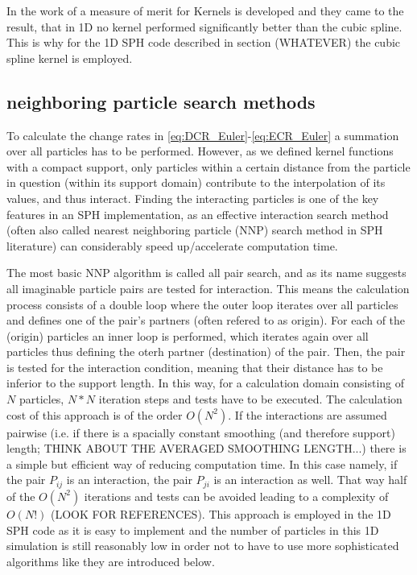 \documentclass{report}
\begin{document}
In the work of \cite{Fulk1996} a measure of merit for Kernels is developed and
they came to the result, that in 1D no kernel performed significantly better
than the cubic spline.
This is why for the 1D SPH code described in section (WHATEVER) the cubic
spline kernel is employed.

\subsection{neighboring particle search methods}
\label{sec:NNPS}
To calculate the change rates in \ref{eq:DCR_Euler}-\ref{eq:ECR_Euler} a
summation over all particles has to be performed. However, as we defined kernel
functions with a compact support, only particles within a certain distance from
the particle in question (within its support domain) contribute to the
interpolation of its values, and thus interact. Finding the interacting
particles is one of the key features in an SPH implementation, as an effective
interaction search method (often also called nearest neighboring particle (NNP)
search method in SPH literature) can considerably speed up/accelerate
computation time. 

The most basic NNP algorithm is called all pair search, and as its name
suggests all imaginable particle pairs are tested for interaction. This means
the calculation process consists of a double loop where the outer loop
iterates over all particles and defines one of the pair's partners (often
refered to as origin). For each of the (origin) particles an inner loop is
performed, which iterates again over all particles thus defining the oterh
partner (destination) of the pair. Then, the pair is tested for the
interaction condition, meaning that their distance has to be inferior to the
support length. In this way, for a calculation domain consisting of $N$
particles, $N*N$ iteration steps and tests have to be executed. The
calculation cost of this approach is of the order $O(N^2)$. 
If the
interactions are assumed pairwise (i.e. if there is a spacially constant
smoothing (and therefore support) length; THINK ABOUT THE AVERAGED SMOOTHING
LENGTH...) there is a simple but efficient way of reducing computation
time. In this case namely, if the pair $P_{ij}$ is an interaction, the pair
$P_{ji}$ is an interaction as well. That way half of the $O(N^2)$ iterations
and tests can be avoided leading to a complexity of $O(N!)$ (LOOK FOR
REFERENCES). This approach is employed in the 1D SPH code as it is easy to
implement\cite{Liu2003} and the number of particles in this 1D simulation is
still reasonably low in order not to have to use more sophisticated algorithms
like they are introduced below.
\end{document}
